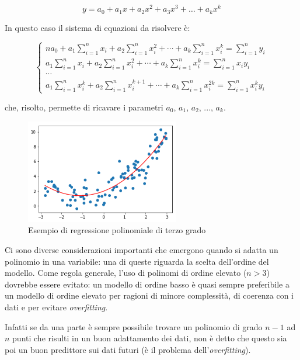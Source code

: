 $$y=a_{0}+a_{1} x+a_{2} x^{2}+a_{3} x^{3}+\ldots+a_{k} x^{k}$$\smallskip

In questo caso il sistema di equazioni da risolvere è:

$$\left\{\begin{array}{l}
n a_{0}+a_{1} \sum_{i=1}^{n} x_{i}+a_{2} \sum_{i=1}^{n} x_{i}^{2}+\cdots+a_{k} \sum_{i=1}^{n} x_{i}^{k}=\sum_{i=1}^{n} y_{i} \\
a_{1} \sum_{i=1}^{n} x_{i}+a_{2} \sum_{i=1}^{n} x_{i}^{2}+\cdots+a_{k} \sum_{i=1}^{n} x_{i}^{k}=\sum_{i=1}^{n} x_{i} y_{i} \\
\cdots \\
a_{1} \sum_{i=1}^{n} x_{i}^{k}+a_{2} \sum_{i=1}^{n} x_{i}^{k+1}+\cdots+a_{k} \sum_{i=1}^{n} x_{i}^{2 k}=\sum_{i=1}^{n} x_{i}^{k} y_{i}
\end{array}\right.$$\smallskip

che, risolto, permette di ricavare i parametri $a_0$, $a_1$, $a_2$, ..., $a_k$.

\begin{figure}[H]
\centering
\includegraphics[width=0.60\textwidth,height=\textheight,keepaspectratio]{img/poly_reg_example.png}
\caption{Esempio di regressione polinomiale di terzo grado}
\label{fig:poly_reg}
\end{figure}

Ci sono diverse considerazioni importanti che emergono quando si adatta un polinomio in una variabile: una di queste riguarda la scelta dell'ordine del modello.
Come regola generale, l'uso di polinomi di ordine elevato ($n > 3$) dovrebbe essere evitato: un modello di ordine basso è quasi sempre preferibile a un modello di ordine elevato per ragioni di minore complessità, di coerenza con i dati e per evitare \textit{overfitting}. \cite{introduction_to_lr}

Infatti se da una parte è sempre possibile trovare un polinomio di grado $n-1$ ad $n$ punti che risulti in un buon adattamento dei dati, non è detto che questo sia poi un buon predittore sui dati futuri (è il problema dell'\textit{overfitting}).

